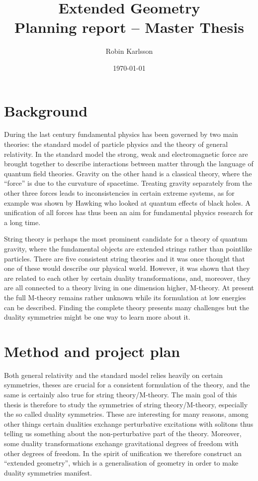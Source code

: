 \documentclass{article}
\title{Extended Geometry \\ Planning report -- Master Thesis}
\author{Robin Karlsson}
\date{\today}
\begin{document}
\maketitle

\section{Background}
During the last century fundamental physics has been governed by two main theories: the standard model of particle physics and the theory of general relativity. In the standard model the strong, weak and electromagnetic force are brought together to describe interactions between matter through the language of quantum field theories. Gravity on the other hand is a classical theory, where the ``force'' is due to the curvature of spacetime. Treating gravity separately from the other three forces leads to inconsistencies in certain extreme systems, as for example was shown by Hawking who looked at quantum effects of black holes. A unification of all forces has thus been an aim for fundamental physics research for a long time. 

String theory is perhaps the most prominent candidate for a theory of quantum gravity, where the fundamental objects are extended strings rather than pointlike particles. There are five consistent string theories and it was once thought that one of these would describe our physical world. However, it was shown that they are related to each other by certain duality transformations, and, moreover, they are all connected to a theory living in one dimension higher, M-theory. At present the full M-theory remains rather unknown while its formulation at low energies can be described. Finding the complete theory presents many challenges but the duality symmetries might be one way to learn more about it. 


\section{Method and project plan}
Both general relativity and the standard model relies heavily on certain symmetries, theses are crucial for a consistent formulation of the theory, and the same is certainly also true for string theory/M-theory. The main goal of this thesis is therefore to study the symmetries of string theory/M-theory, especially the so called duality symmetries. These are interesting for many reasons, among other things certain dualities exchange perturbative excitations with solitons thus telling us something about the non-perturbative part of the theory. Moreover, some duality transformations exchange gravitational degrees of freedom with other degrees of freedom. In the spirit of unification we therefore construct an ``extended geometry'', which is a generalisation of geometry in order to make duality symmetries manifest.   
\end{document}
